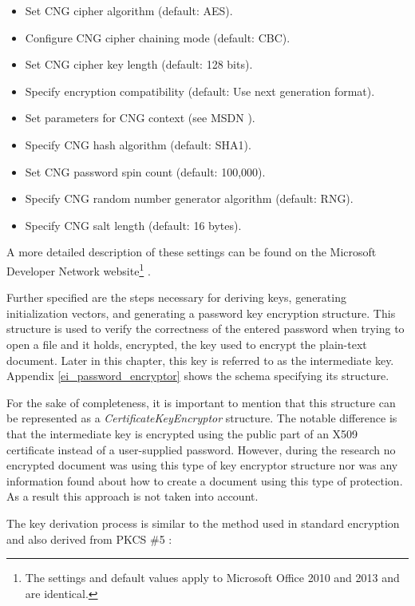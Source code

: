 \documentclass[11pt,oneside]{fithesis2}
\begin{document}
\begin{itemize}
\setlength\itemsep{0.1em}
	\item{Set CNG cipher algorithm (default: AES).}
	\item{Configure CNG cipher chaining mode (default: CBC).}
	\item{Set CNG cipher key length (default: 128 bits).}
	\item{Specify encryption compatibility (default: Use next generation format).}
	\item{Set parameters for CNG context (see MSDN \cite{cng_functions}).}	
	\item{Specify CNG hash algorithm (default: SHA1).}
	\item{Set CNG password spin count (default: 100,000).}
	\item{Specify CNG random number generator algorithm (default: RNG).}
	\item{Specify CNG salt length (default: 16 bytes).}
\end{itemize}

A more detailed description of these settings can be found on the Microsoft Developer Network website\footnote{The settings and default values apply to Microsoft Office 2010 and 2013 and are identical.} \cite{plan_office_crypto}. 

Further specified are the steps necessary for deriving keys, generating initialization vectors, and generating a password key encryption structure. This structure is used to verify the correctness of the entered password when trying to open a file and it holds, encrypted, the key used to encrypt the plain-text document. Later in this chapter, this key is referred to as the intermediate key. Appendix \ref{ei_password_encryptor} shows the schema specifying its structure.

For the sake of completeness, it is important to mention that this structure can be represented as a \textit{CertificateKeyEncryptor} structure. The notable difference is that the intermediate key is encrypted using the public part of an X509 certificate instead of a user-supplied password. However, during the research no encrypted document was using this type of key encryptor structure nor was any information found about how to create a document using this type of protection. As a result this approach is not taken into account.

The key derivation process is similar to the method used in standard encryption and also derived from PKCS \#5 \cite{rfc2898}:
\end{document}
